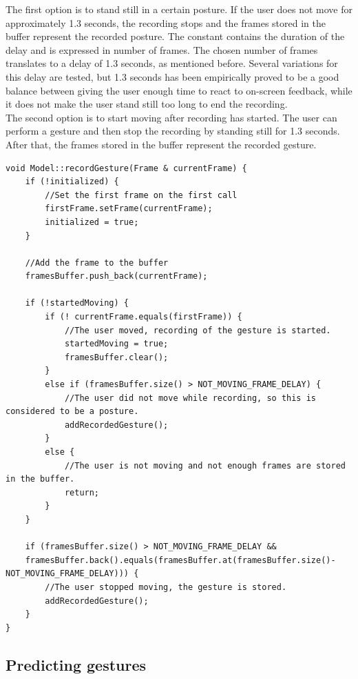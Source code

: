 The first option is to stand still in a certain posture. If the user does not move for approximately 1.3 seconds, the recording stops and the frames stored in the buffer represent the recorded posture. The constant  contains the duration of the delay and is expressed in number of frames. The chosen number of frames translates to a delay of 1.3 seconds, as mentioned before. Several variations for this delay are tested, but 1.3 seconds has been empirically proved to be a good balance between giving the user enough time to react to on-screen feedback, while it does not make the user stand still too long to end the recording.\\

The second option is to start moving after recording has started. The user can perform a gesture and then stop the recording by standing still for 1.3 seconds. After that, the frames stored in the buffer represent the recorded gesture.\\

\begin{lstlisting}[caption=method to record a gesture, label=code_record_gesture]
void Model::recordGesture(Frame & currentFrame) {
	if (!initialized) {
		//Set the first frame on the first call
		firstFrame.setFrame(currentFrame);
		initialized = true;
	}
	
	//Add the frame to the buffer
	framesBuffer.push_back(currentFrame);

	if (!startedMoving) {
		if (! currentFrame.equals(firstFrame)) {
			//The user moved, recording of the gesture is started.
			startedMoving = true;
			framesBuffer.clear();
		}
		else if (framesBuffer.size() > NOT_MOVING_FRAME_DELAY) {
			//The user did not move while recording, so this is considered to be a posture.
			addRecordedGesture();
		}
		else {
			//The user is not moving and not enough frames are stored in the buffer.
			return;
		}
	}

	if (framesBuffer.size() > NOT_MOVING_FRAME_DELAY &&
	framesBuffer.back().equals(framesBuffer.at(framesBuffer.size()-NOT_MOVING_FRAME_DELAY))) {
		//The user stopped moving, the gesture is stored.
		addRecordedGesture();
	}
}
\end{lstlisting}


\subsection{Predicting gestures}

